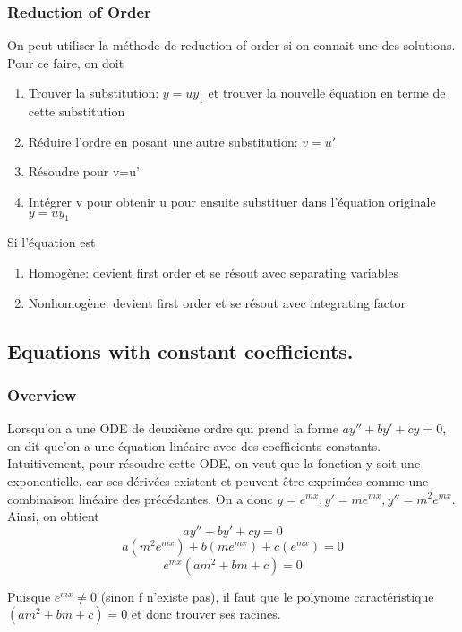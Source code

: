\documentclass{article}
\begin{document}
\subsubsection{Reduction of Order}%
\label{ssub:Reduction of Order}

On peut utiliser la méthode de reduction of order si on connait une
des solutions. Pour ce faire, on doit
\begin{enumerate}
    \item Trouver la substitution: $ y= u y_1$ et trouver la nouvelle
	équation en terme de cette substitution
    \item Réduire l'ordre en posant une autre substitution: $ v=u'$
    \item Résoudre pour v=u'
    \item Intégrer v pour obtenir u pour ensuite substituer dans
	l'équation originale $y= u y_1$
\end{enumerate}

\begin{remark}
    Si l'équation est
    \begin{enumerate}
        \item Homogène: devient first order et se résout avec separating
	    variables
	\item Nonhomogène: devient first order et se résout avec
	    integrating factor
    \end{enumerate}
\end{remark}

\subsection{Equations with constant coefficients.}
\subsubsection{Overview}%
\label{ssub:Overview}

Lorsqu'on a une ODE de deuxième ordre qui prend la forme
$ ay'' + by' + cy = 0$, on dit que'on a une équation linéaire avec
des coefficients constants. Intuitivement, pour résoudre cette ODE,
on veut que la fonction y soit une exponentielle, car ses dérivées
existent et peuvent être exprimées comme une combinaison linéaire des
précédantes. On a donc $ y=e^{mx}, y'=me^{mx}, y''=m^2 e^{mx}$. Ainsi,
on obtient
$$ ay'' + by' + cy = 0$$
$$ a(m^2 e^{mx}) + b(me^{mx})+c(e^{mx})=0$$
$$ e^{mx} (am^2+bm+c)=0$$

Puisque $e^{mx} \neq 0$ (sinon f n'existe pas), il faut que le polynome
caractéristique $(am^2+bm+c)=0$ et donc trouver ses racines.
\end{document}
